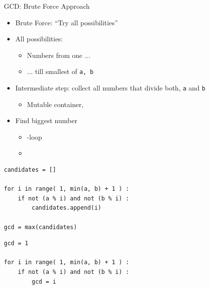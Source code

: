 \begin{frame}{GCD: Brute Force Approach}
%
\begin{itemize}
\item Brute Force: \enquote{Try all possibilities}
\item All possibilities:
	\begin{itemize}
	\item Numbers from one ...
	\item ... till smallest of \texttt{a, b}
	\end{itemize}
\item Intermediate step: collect all numbers that divide both, \texttt{a} and \texttt{b}
	\begin{itemize}
	\item[\Thus] Mutable container, \eg {}
	\end{itemize}
\item Find biggest number
	\begin{itemize}
	\item {}-loop
	\item {}
	\end{itemize}
\end{itemize}
%
\end{frame}


\begin{frame}[fragile]
%
\begin{codebox}
\begin{verbatim}
candidates = []
    
for i in range( 1, min(a, b) + 1 ) :
    if not (a % i) and not (b % i) :
        candidates.append(i)

gcd = max(candidates)
\end{verbatim}
\end{codebox}
%
\begin{codebox}
\begin{verbatim}
gcd = 1
    
for i in range( 1, min(a, b) + 1 ) :
    if not (a % i) and not (b % i) :
        gcd = i
\end{verbatim}
\end{codebox}
%
\end{frame}



